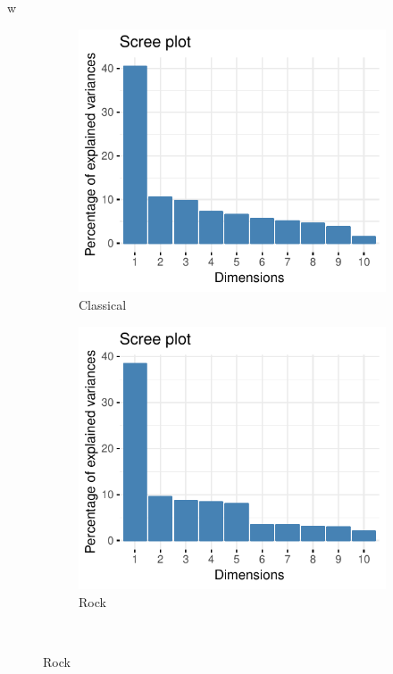 w\documentclass[11pt, oneside]{article}
\begin{document}
\begin{figure}[h]
\centering  
\begin{subfigure}[b]{0.5\textwidth}
        \includegraphics[width=\textwidth]{class_scree.pdf} 
        \caption{Classical}
    \end{subfigure}%
    \begin{subfigure}[b]{0.5\textwidth}
        \includegraphics[width=\textwidth]{rock_scree.pdf} 
        \caption{Rock}
    \end{subfigure} \\

\end{figure}
\end{document}
